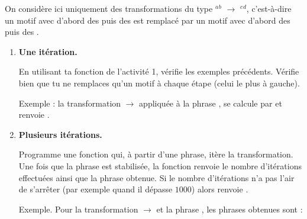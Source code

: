 \documentclass[11pt,class=report,crop=false]{standalone}
\begin{document}

\begin{activite}


On considère ici uniquement des transformations du type \rzero$^a$\run$^b$ $\rightarrow$ \run$^c$\rzero$^d$, c'est-à-dire un motif avec d'abord des \rzero{} puis des \run{} est remplacé par un motif avec d'abord des \run{} puis des \rzero.



\begin{enumerate}
  \item \textbf{Une itération.}
  
   En utilisant ta fonction  de l'activité 1, vérifie les exemples précédents. Vérifie bien que tu ne remplaces qu'un motif à chaque étape (celui le plus à gauche).
  
  Exemple : la transformation \rzero\run{} $\rightarrow$ \run\rzero{} appliquée à la phrase \run\rzero\run, se calcule par  et renvoie .
   
  \item \textbf{Plusieurs itérations.}
  
  
  Programme une fonction  qui, à partir d'une phrase, itère la transformation. Une fois que la phrase est stabilisée, la fonction renvoie le nombre d'itérations effectuées ainsi que la phrase obtenue. Si le nombre d'itérations n'a pas l'air de s'arrêter (par exemple quand il dépasse $1000$) alors renvoie .
  
  Exemple. Pour la transformation \rzero\rzero\run\run{} $\rightarrow$ \run\run\rzero\rzero{} et la phrase \rzero\rzero\rzero\rzero\run\run\rzero\run\run, les phrases obtenues sont : 
  
{\small
{}
}


\end{enumerate}
\end{activite}
\end{document}

